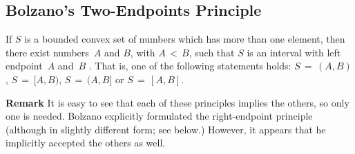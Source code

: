 \V

\VV
            \subsection{\small{\bf Bolzano's Two-Endpoints Principle}}
            \label{DefB30.07D}

\V

        If $S$ is a bounded convex set of numbers which has more than one element,
    then there exist numbers~$A$ and $B$, with $A\,<\,B$, such that $S$ is an interval with left endpoint~$A$ and~$B$ .
    That is, one of the following statements holds: $S \,=\, (A,B)$, $S \,=\, [A,B)$, $S \,=\, (A,B]$ or $S \,=\, [A,B]$.

\VV

        {\bf Remark} It is easy to see that each of these principles implies the others, so only one is needed.
    Bolzano explicitly formulated the right-endpoint principle (although in slightly different form; see below.)
    However, it appears that he implicitly accepted the others as well.


